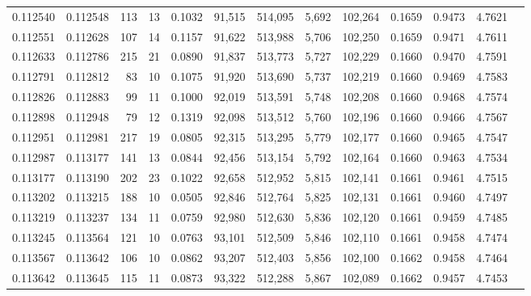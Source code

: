 \begin{tabular}{rrrrrrrrrrrrr}
0.112540 & 0.112548 &   113 &  13 &                                     0.1032 &  91,515 & 514,095 &   5,692 & 102,264 & 0.1659 & 0.9473 & 4.7621 \\
0.112551 & 0.112628 &   107 &  14 &                                     0.1157 &  91,622 & 513,988 &   5,706 & 102,250 & 0.1659 & 0.9471 & 4.7611 \\
0.112633 & 0.112786 &   215 &  21 &                                     0.0890 &  91,837 & 513,773 &   5,727 & 102,229 & 0.1660 & 0.9470 & 4.7591 \\
0.112791 & 0.112812 &    83 &  10 &                                     0.1075 &  91,920 & 513,690 &   5,737 & 102,219 & 0.1660 & 0.9469 & 4.7583 \\
0.112826 & 0.112883 &    99 &  11 &                                     0.1000 &  92,019 & 513,591 &   5,748 & 102,208 & 0.1660 & 0.9468 & 4.7574 \\
0.112898 & 0.112948 &    79 &  12 &                                     0.1319 &  92,098 & 513,512 &   5,760 & 102,196 & 0.1660 & 0.9466 & 4.7567 \\
0.112951 & 0.112981 &   217 &  19 &                                     0.0805 &  92,315 & 513,295 &   5,779 & 102,177 & 0.1660 & 0.9465 & 4.7547 \\
0.112987 & 0.113177 &   141 &  13 &                                     0.0844 &  92,456 & 513,154 &   5,792 & 102,164 & 0.1660 & 0.9463 & 4.7534 \\
0.113177 & 0.113190 &   202 &  23 &                                     0.1022 &  92,658 & 512,952 &   5,815 & 102,141 & 0.1661 & 0.9461 & 4.7515 \\
0.113202 & 0.113215 &   188 &  10 &                                     0.0505 &  92,846 & 512,764 &   5,825 & 102,131 & 0.1661 & 0.9460 & 4.7497 \\
0.113219 & 0.113237 &   134 &  11 &                                     0.0759 &  92,980 & 512,630 &   5,836 & 102,120 & 0.1661 & 0.9459 & 4.7485 \\
0.113245 & 0.113564 &   121 &  10 &                                     0.0763 &  93,101 & 512,509 &   5,846 & 102,110 & 0.1661 & 0.9458 & 4.7474 \\
0.113567 & 0.113642 &   106 &  10 &                                     0.0862 &  93,207 & 512,403 &   5,856 & 102,100 & 0.1662 & 0.9458 & 4.7464 \\
0.113642 & 0.113645 &   115 &  11 &                                     0.0873 &  93,322 & 512,288 &   5,867 & 102,089 & 0.1662 & 0.9457 & 4.7453 \\

\end{tabular}
